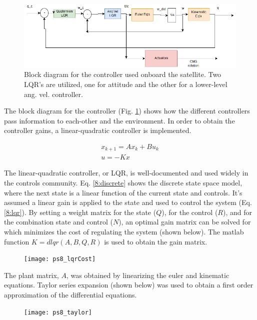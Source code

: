 \documentclass[12pt, letterpaper]{article}
\begin{document}
\begin{figure}[H]
	\centering
	\includegraphics[scale=0.7]{PS8_controller}
	\caption{Block diagram for the controller used onboard the satellite. Two LQR's are utilized, one for attitude and the other for a lower-level ang. vel. controller.}
	\label{8:controller}
\end{figure}

The block diagram for the controller (Fig. \ref{8:controller}) shows how the different controllers pass information to each-other and the environment. In order to obtain the controller gains, a linear-quadratic controller is implemented.

\begin{gather}
x_{k+1}=Ax_k+Bu_k
\label{8:discrete} \\ 
u=-Kx
\label{8:lqr}
\end{gather}

The linear-quadratic controller, or LQR, is well-documented and used widely in the controls community. Eq. \ref{8:discrete} shows the discrete state space model, where the next state is a linear function of the current state and controls. It's assumed a linear gain is applied to the state and used to control the system (Eq. \ref{8:lqr}). By setting a weight matrix for the state ($Q$), for the control ($R$), and for the combination state and control ($N$), an optimal gain matrix can be solved for which minimizes the cost of regulating the system (shown below). The matlab function $K=dlqr(A,B,Q,R)$ is used to obtain the gain matrix.

\begin{figure}[H]
	\centering
	\texttt{[image: ps8\_lqrCost]}
	\label{8:lqrCost}
\end{figure}


The plant matrix, $A$, was obtained by linearizing the euler and kinematic equations. Taylor series expansion (shown below) was used to obtain a first order approximation of the differential equations.

\begin{figure}[H]
	\centering
	\texttt{[image: ps8\_taylor]}
	\label{8:taylor}
\end{figure}
\end{document}
